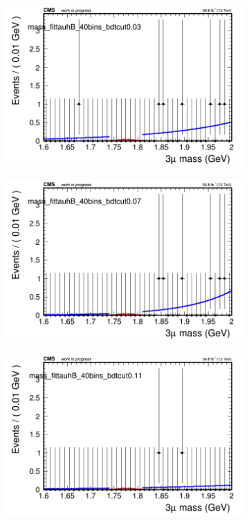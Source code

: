 \begin{figure}[H]
\begin{subfigure}{0.2\textwidth}
        \includegraphics[width=\textwidth]{unfixed_exp/plots/tauhB/massfit_tauhB_40bins_bdtcut0.03.png}
        \caption{}
    \end{subfigure}
    \begin{subfigure}{0.2\textwidth}
        \includegraphics[width=\textwidth]{unfixed_exp/plots/tauhB/massfit_tauhB_40bins_bdtcut0.07.png}
        \caption{}
    \end{subfigure}
    \begin{subfigure}{0.2\textwidth}
        \includegraphics[width=\textwidth]{unfixed_exp/plots/tauhB/massfit_tauhB_40bins_bdtcut0.11.png}

\end{subfigure}
\end{figure}
